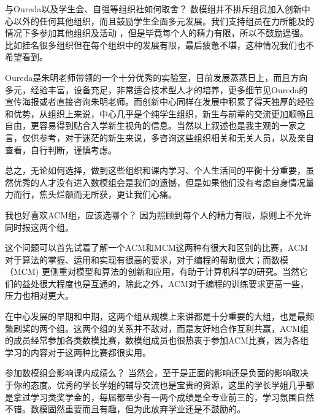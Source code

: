 \documentclass[xcolor={usenames,dvipsnames}]{beamer}
\begin{document}
\begin{frame}
    \begin{exampleblock}{与Oureda以及学生会、自强等组织社如何取舍？}
    数模组并不排斥组员加入创新中心以外的任何其他组织，而且鼓励学生全面多元发展。我们支持组员在力所能及的情况下多参加其他组织及活动 ，但是毕竟每个人的精力有限，所以不鼓励逞强。比如挂名很多组织但在每个组织中的发展有限，最后疲惫不堪，这种情况我们也不希望看到。
    
    Oureda是朱明老师带领的一个十分优秀的实验室，目前发展蒸蒸日上，而且方向多元，经验丰富，设备充足，非常适合技术型人才的培养，更多细节见Oureda的宣传海报或者直接咨询朱明老师。而创新中心同样在发展中积累了得天独厚的经验和优势，从组织上来说，中心几乎是个纯学生组织，新生与前辈的交流更加顺畅且自由，更容易得到贴合入学新生视角的信息。当然以上叙述也是我主观的一家之言，仅供参考，对于迷茫的新生来说，多咨询这些组织相关和无关人员，以及亲自查看，自行判断，谨慎考虑。
    
    总之，无论如何选择，做到这些组织和课内学习、个人生活间的平衡十分重要，虽然优秀的人才没有进入数模组会是我们的遗憾，但是如果他们没有考虑自身情况量力而行，焦头烂额而无所获，更让我们心痛。
    \end{exampleblock}
\end{frame}

\begin{frame}
\begin{alertblock}{我也好喜欢ACM组，应该选哪个？}
因为照顾到每个人的精力有限，原则上不允许同时报这两个组。

这个问题可以首先试着了解一个ACM和MCM这两种有很大和区别的比赛，ACM对于算法的掌握、运用和实现有很高的要求，对于编程的帮助很大；而数模（MCM) 更侧重对模型和算法的创新和应用，有助于计算机科学的研究。当然它们的益处很大程度也是互通的，除此之外，ACM对于编程的训练要求更高一些，压力也相对更大。

在中心发展的早期和中期，这两个组从规模上来讲都是十分重要的大组，也是最频繁刷奖的两个组。这两个组的关系并不敌对，而是友好地合作互利共赢，ACM组的成员经常参加各类数模比赛，数模组成员也很热衷于参加ACM比赛，因为各组学习的内容对于这两种比赛都很实用。
\end{alertblock}

\begin{block}{参加数模组会影响课内成绩么？}
当然会，至于是正面的影响还是负面的影响取决于你的态度。优秀的学长学姐的辅导交流也是宝贵的资源，这里的学长学姐几乎都是拿过学习类奖学金的，每届都至少有一两个成绩是全专业前三的，学习氛围自然不错。数模固然重要而且有趣，但为此放弃学业还是不鼓励的。
\end{block}
\end{frame}
\end{document}

